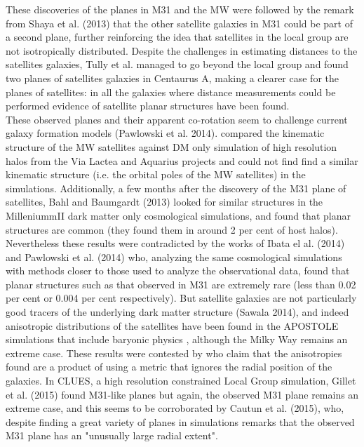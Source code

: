 \documentclass{emulateapj}
\begin{document}
These discoveries of the planes in M31 and the MW were followed by the
remark from Shaya et al. (2013) that the other satellite galaxies in
M31 could be part of a second plane, further reinforcing the idea that
satellites in the local group are not isotropically distributed.
Despite the challenges in estimating distances to the satellites
galaxies, Tully et al. managed to go beyond the local group and found
two planes of satellites galaxies in Centaurus A, making a clearer
case for the planes of satellites: in all the galaxies where distance
measurements could be performed evidence of satellite planar
structures have been found.\\

These observed planes and their apparent co-rotation seem to challenge
current galaxy formation models (Pawlowski et al. 2014).
\cite{2012MNRAS.424...80P} compared the kinematic structure of the MW
satellites against DM only simulation of high resolution halos from
the Via Lactea and Aquarius projects and could not find find a similar
kinematic structure (i.e. the orbital poles of the MW satellites) in
the simulations. Additionally, a few months after the discovery of the
M31 plane of satellites, Bahl and Baumgardt (2013) looked for similar
structures in the MilleniummII dark matter only cosmological
simulations, and found that planar structures are common (they found
them in around 2 per cent of host halos). Nevertheless these results
were contradicted by the works of Ibata el al. (2014) and Pawlowski et
al. (2014) who, analyzing the same cosmological simulations with
methods closer to those used to analyze the observational data, found
that planar structures such as that observed in M31 are extremely rare
(less than 0.02 per cent or 0.004 per cent respectively). But
satellite galaxies are not particularly good tracers of the underlying
dark matter structure (Sawala 2014), and indeed anisotropic
distributions of the satellites have been found in the APOSTOLE
simulations that include baryonic physics \citep{2016MNRAS.457.1931S},
although the Milky Way remains an extreme case. These results were
contested by \cite{2015ApJ...815...19P} who claim that the
anisotropies found are a product of using a metric that ignores the
radial position of the galaxies. %
In CLUES, a high resolution constrained Local Group simulation,
Gillet et al. (2015) found M31-like planes but again, the observed M31 plane
remains an extreme case, and this seems to be corroborated by Cautun
et al. (2015), who, despite finding a great variety of planes in
simulations remarks that the observed M31 plane has an "unusually large
radial extent".\\  
\end{document}
